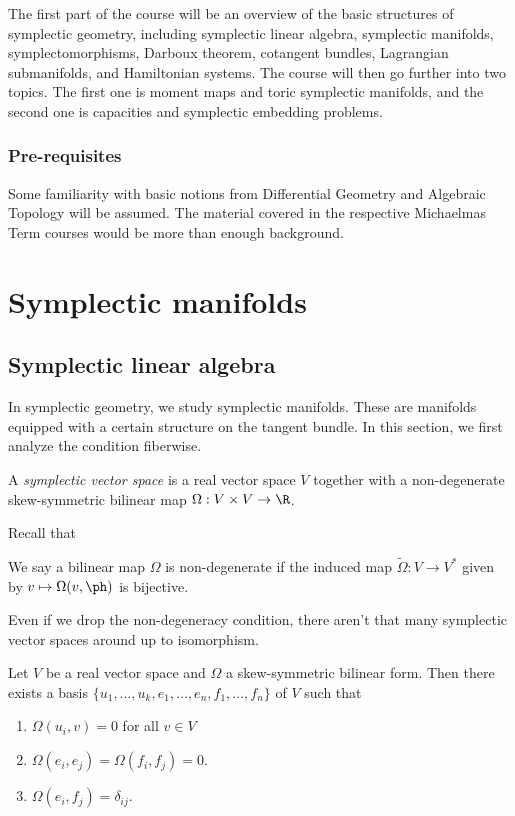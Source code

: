 \documentclass[a4paper]{article}
\begin{document}
\maketitle
{\small
\setlength{\parindent}{0em}
\setlength{\parskip}{1em}
The first part of the course will be an overview of the basic structures of symplectic geometry, including symplectic linear algebra, symplectic manifolds, symplectomorphisms, Darboux theorem, cotangent bundles, Lagrangian submanifolds, and Hamiltonian systems. The course will then go further into two topics. The first one is moment maps and toric symplectic manifolds, and the second one is capacities and symplectic embedding problems.

\subsubsection*{Pre-requisites}
Some familiarity with basic notions from Differential Geometry and Algebraic Topology will be assumed. The material covered in the respective Michaelmas Term courses would be more than enough background.
}
\tableofcontents
\section{Symplectic manifolds}
\subsection{Symplectic linear algebra}
In symplectic geometry, we study symplectic manifolds. These are manifolds equipped with a certain structure on the tangent bundle. In this section, we first analyze the condition fiberwise.

\begin{defi}
  A \emph{symplectic vector space} is a real vector space $V$ together with a non-degenerate skew-symmetric bilinear map $\Omega: V \times V \to \R$.
\end{defi}

Recall that
\begin{defi}
  We say a bilinear map $\Omega$ is non-degenerate if the induced map $\tilde{\Omega}: V \to V^*$ given by $v \mapsto \Omega(v, \ph)$ is bijective.
\end{defi}

Even if we drop the non-degeneracy condition, there aren't that many symplectic vector spaces around up to isomorphism.
\begin{thm}
  Let $V$ be a real vector space and $\Omega$ a skew-symmetric bilinear form. Then there exists a basis $\{u_1, \ldots, u_k, e_1, \ldots, e_n, f_1, \ldots, f_n\}$ of $V$ such that
  \begin{enumerate}
    \item $\Omega(u_i, v) = 0$ for all $v \in V$
    \item $\Omega(e_i, e_j) = \Omega(f_i, f_j) = 0$.
    \item $\Omega(e_i, f_j) = \delta_{ij}$.
  \end{enumerate}
\end{thm}
\end{document}
